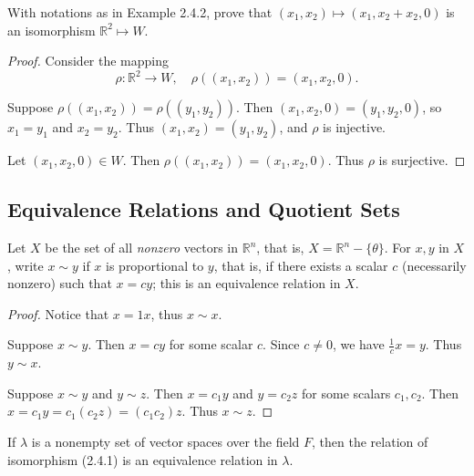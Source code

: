 \begin{tcolorbox}[title=Problem 11, breakable]
    With notations as in Example 2.4.2, prove that $(x_1, x_2) \mapsto (x_1, x_2 + x_2, 0)$
    is an isomorphism $\mathbb{R}^2 \mapsto W$.
\end{tcolorbox}

\begin{proof}
    Consider the mapping
    \[
        \rho : \mathbb{R}^2 \longrightarrow W, \quad
        \rho((x_1, x_2)) = (x_1, x_2, 0).
    \]

    Suppose $\rho((x_1, x_2)) = \rho((y_1, y_2))$.
    Then $(x_1, x_2, 0) = (y_1, y_2, 0)$, so $x_1 = y_1$ and $x_2 = y_2$.
    Thus $(x_1, x_2) = (y_1, y_2)$, and $\rho$ is injective.

    Let $(x_1, x_2, 0) \in W$.
    Then $\rho((x_1, x_2)) = (x_1, x_2, 0)$.
    Thus $\rho$ is surjective.
\end{proof}

\subsection{Equivalence Relations and Quotient Sets}

\begin{tcolorbox}[title=Problem 2, breakable]
    Let $X$ be the set of all \emph{nonzero}
    vectors in $\mathbb{R}^n$, that is,
    $X = \mathbb{R}^n - \{\theta\}$.
    For $x, y$ in $X$, write $x \sim y$
    if $x$ is proportional to $y$, that is,
    if there exists a scalar $c$ (necessarily nonzero)
    such that $x = cy$; this is an equivalence relation 
    in $X$.
\end{tcolorbox}


\begin{proof}
    Notice that $x = 1x$, thus $x \sim x$.

    Suppose $x \sim y$.
    Then $x = cy$ for some scalar $c$.
    Since $c \ne 0$, we have $\frac{1}{c}x = y$.
    Thus $y \sim x$.

    Suppose $x \sim y$ and $y \sim z$.
    Then $x = c_1 y$ and $y = c_2 z$ for some scalars $c_1, c_2$.
    Then $x = c_1 y = c_1(c_2 z) = (c_1 c_2)z$.
    Thus $x \sim z$.
\end{proof}

\begin{tcolorbox}[title=Problem 4, breakable]
    If $\lambda$ is a nonempty set of vector spaces over the field $F$, then the relation 
    of isomorphism (2.4.1) is an equivalence relation in $\lambda$.
\end{tcolorbox}

